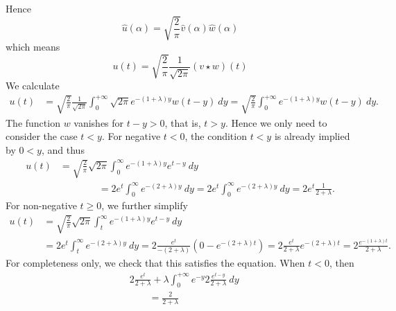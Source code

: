 \documentclass[11pt]{article}
\begin{document}
\begin{solution}
\[    \]
    Hence 
    \[
        \hat u(\alpha)  = \sqrt{ \frac{2}{\pi} } \hat v(\alpha) \hat w(\alpha) 
    \]
    which means 
    \[
        u(t) = \sqrt{ \frac{2}{\pi} } \frac{1}{\sqrt{2\pi}} ( v \star w )(t)
    \]
    We calculate 
    \begin{align*}
        u(t) 
        &
        = 
        \sqrt{ \frac{2}{\pi} } 
        \frac{1}{\sqrt{2\pi}}
        \int_{0}^{+\infty} \sqrt{2\pi} e^{-(1+\lambda)y} w( t - y ) \ d y
        = 
        \sqrt{ \frac{2}{\pi} } 
        \int_{0}^{+\infty} e^{-(1+\lambda)y} w( t - y ) \ d y
        .
    \end{align*}
    The function $w$ vanishes for $t - y > 0$, that is, $t > y$. 
    Hence we only need to consider the case $t < y$.
    For negative $t < 0$, the condition $t < y$ is already implied by $0 < y$, and thus 
    \begin{align}
        u(t) 
        &
        = 
        \sqrt{ \frac{2}{\pi} } 
        \sqrt{2\pi} 
        \int_{0}^{\infty} 
        e^{-(1+\lambda)y} e^{ t - y } \ dy
        \\&
        \qquad\qquad 
        =
        2
        e^{t}
        \int_{0}^{\infty} 
        e^{-(2+\lambda)y} \ dy
        =
        2
        e^{t}
        \int_{0}^{\infty} 
        e^{-(2+\lambda)y} \ dy
        =
        2 e^{t} \frac{1}{2+\lambda}
        .
    \end{align}
    For non-negative $t \geq 0$, we further simplify 
    \begin{align*}
        u(t) 
        &
        = 
        \sqrt{ \frac{2}{\pi} } 
        \sqrt{2\pi} 
        \int_{t}^{\infty} 
        e^{-(1+\lambda)y} e^{ t - y } \ dy
        \\&
        = 
        2 
        e^{t}
        \int_{t}^{\infty} 
        e^{-(2+\lambda)y} \ dy
        = 
        2 
        \frac{ e^{t} }{ -(2+\lambda) }
        \left( 0 - e^{-(2+\lambda) t} \right)
        = 
        2 
        \frac{ e^{t} }{ 2+\lambda }
        e^{-(2+\lambda) t} 
        = 
        2 \frac{ e^{-(1+\lambda) t}  }{ 2+\lambda }
        .
    \end{align*}
    For completeness only, we check that this satisfies the equation. 
    When $t < 0$, then 
    \begin{align}
        &
        2
        \frac{e^{t}}{2+\lambda}
        + 
        \lambda 
        \int_{0}^{+\infty} 
        e^{-y} 
        2
        \frac{e^{t-y}}{2+\lambda}
        \ dy 
        \\&\qquad
        =
        \frac{2}{2+\lambda}

\end{align}
\end{solution}
\end{document}
